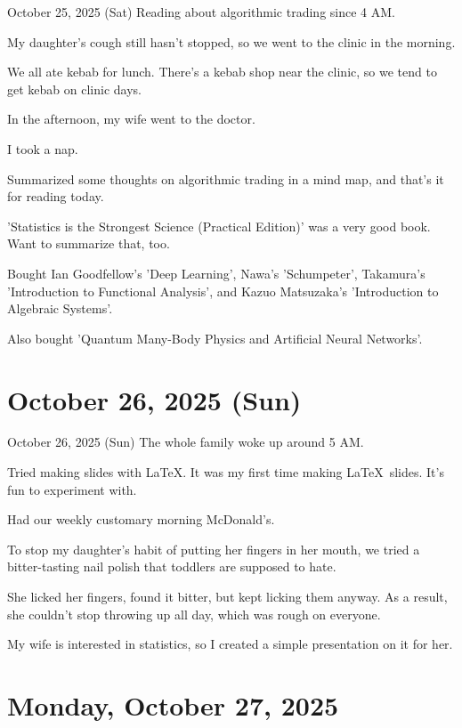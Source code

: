 \documentclass[dvipdfmx, autodetect-engine, aspectratio=169, 10.5pt]{beamer}
\begin{document}
\begin{frame}{October 25, 2025 (Sat)}
Reading about algorithmic trading since 4 AM.

My daughter's cough still hasn't stopped, so we went to the clinic in the morning.

We all ate kebab for lunch.
There's a kebab shop near the clinic, so we tend to get kebab on clinic days.

In the afternoon, my wife went to the doctor.

I took a nap.

Summarized some thoughts on algorithmic trading in a mind map, and that's it for reading today.

'Statistics is the Strongest Science (Practical Edition)' was a very good book. Want to summarize that, too.

Bought Ian Goodfellow's 'Deep Learning', Nawa's 'Schumpeter', Takamura's 'Introduction to Functional Analysis', and Kazuo Matsuzaka's 'Introduction to Algebraic Systems'.

Also bought 'Quantum Many-Body Physics and Artificial Neural Networks'.
\end{frame}

\section{October 26, 2025 (Sun)}

\begin{frame}{October 26, 2025 (Sun)}
The whole family woke up around 5 AM.

Tried making slides with \LaTeX.
It was my first time making \LaTeX\ slides. It's fun to experiment with.

Had our weekly customary morning McDonald's.

To stop my daughter's habit of putting her fingers in her mouth, we tried a bitter-tasting nail polish that toddlers are supposed to hate.

She licked her fingers, found it bitter, but kept licking them anyway. As a result, she couldn't stop throwing up all day, which was rough on everyone.

My wife is interested in statistics, so I created a simple presentation on it for her.
\end{frame}

\section{Monday, October 27, 2025}
\end{document}
